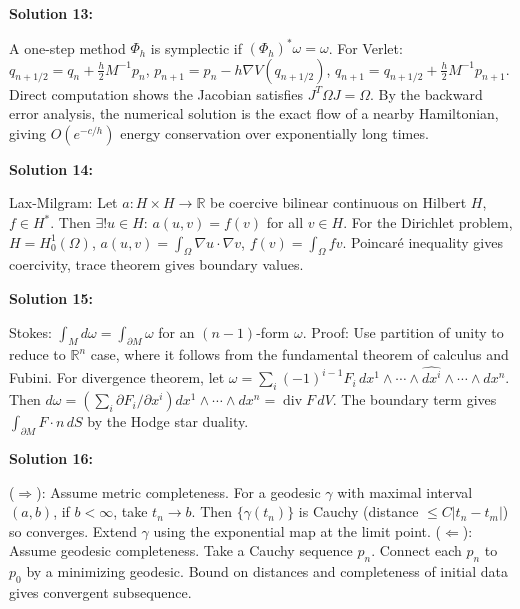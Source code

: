 \documentclass[12pt,a4paper]{exam}
\begin{document}
\vspace{0.5cm}

\textbf{Solution 13:}

A one-step method $\Phi_h$ is symplectic if $(\Phi_h)^*\omega = \omega$. For Verlet: $q_{n+1/2} = q_n + \frac{h}{2} M^{-1} p_n$, $p_{n+1} = p_n - h \nabla V(q_{n+1/2})$, $q_{n+1} = q_{n+1/2} + \frac{h}{2} M^{-1} p_{n+1}$. Direct computation shows the Jacobian satisfies $J^T \Omega J = \Omega$. By the backward error analysis, the numerical solution is the exact flow of a nearby Hamiltonian, giving $O(e^{-c/h})$ energy conservation over exponentially long times.

\vspace{0.5cm}

\textbf{Solution 14:}

Lax-Milgram: Let $a: H \times H \to \mathbb{R}$ be coercive bilinear continuous on Hilbert $H$, $f \in H^*$. Then $\exists! u \in H$: $a(u,v) = f(v)$ for all $v \in H$. For the Dirichlet problem, $H = H_0^1(\Omega)$, $a(u,v) = \int_\Omega \nabla u \cdot \nabla v$, $f(v) = \int_\Omega f v$. Poincar\'e inequality gives coercivity, trace theorem gives boundary values.

\vspace{0.5cm}

\textbf{Solution 15:}

Stokes: $\int_M d\omega = \int_{\partial M} \omega$ for an $(n-1)$-form $\omega$. Proof: Use partition of unity to reduce to $\mathbb{R}^n$ case, where it follows from the fundamental theorem of calculus and Fubini. For divergence theorem, let $\omega = \sum_i (-1)^{i-1} F_i \, dx^1 \wedge \cdots \wedge \widehat{dx^i} \wedge \cdots \wedge dx^n$. Then $d\omega = (\sum_i \partial F_i/\partial x^i) dx^1 \wedge \cdots \wedge dx^n = \operatorname{div} F \, dV$. The boundary term gives $\int_{\partial M} F \cdot n \, dS$ by the Hodge star duality.

\vspace{0.5cm}

\textbf{Solution 16:}

($\Rightarrow$): Assume metric completeness. For a geodesic $\gamma$ with maximal interval $(a,b)$, if $b < \infty$, take $t_n \to b$. Then $\{\gamma(t_n)\}$ is Cauchy (distance $\leq C|t_n - t_m|$) so converges. Extend $\gamma$ using the exponential map at the limit point. ($\Leftarrow$): Assume geodesic completeness. Take a Cauchy sequence $p_n$. Connect each $p_n$ to $p_0$ by a minimizing geodesic. Bound on distances and completeness of initial data gives convergent subsequence.
\end{document}

